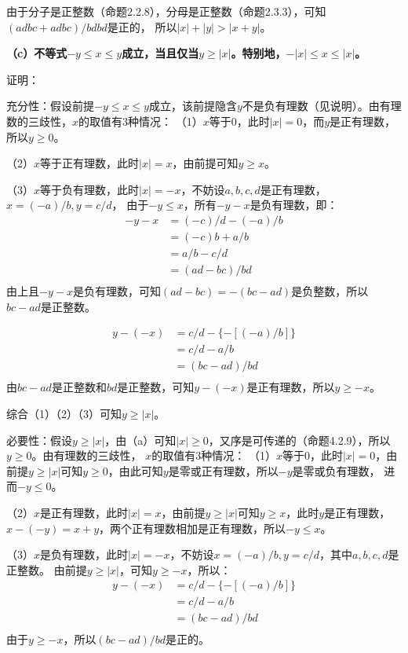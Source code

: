 \documentclass{article}
\theoremstyle{mystyle}
\begin{document}
由于分子是正整数（命题2.2.8），分母是正整数（命题2.3.3），可知$(adbc+adbc) / bdbd$是正的，
所以$ |x| + |y| > |x+y|$。

\textbf{（c）不等式$-y \leq x \leq y$成立，当且仅当$y \geq |x|$。特别地，$-|x| \leq x \leq |x|$。}

证明：

充分性：假设前提$-y \leq x \leq y$成立，该前提隐含$y$不是负有理数（见说明）。由有理数的三歧性，$x$的取值有3种情况：
（1）$x$等于0，此时$|x|=0$，而$y$是正有理数，所以$y \geq 0$。

（2）$x$等于正有理数，此时$|x|=x$，由前提可知$y \geq x$。

（3）$x$等于负有理数，此时$|x|=-x$，不妨设$a,b,c,d$是正有理数，$x=(-a)/b,y=c/d$，
由于$-y \leq x$，所有$-y-x$是负有理数，即：
\begin{align*}
  -y - x & = (-c)/d - (-a)/b \\
         & = (-c)b + a/b     \\
         & = a/b - c/d       \\
         & = (ad - bc) / bd  \\
\end{align*}
由上且$-y-x$是负有理数，可知$(ad-bc)=-(bc-ad)$是负整数，所以$bc-ad$是正整数。

\begin{align*}
  y - (-x) & = c/d - \{-[(-a)/b]\} \\
           & = c/d - a/b           \\
           & = (bc - ad) / bd      \\
\end{align*}
由$bc-ad$是正整数和$bd$是正整数，可知$y-(-x)$是正有理数，所以$y \geq -x$。

综合（1）（2）（3）可知$y \geq |x|$。

必要性：假设$y \geq |x|$，由（a）可知$|x| \geq 0$，又序是可传递的（命题4.2.9），所以$y \geq 0$。由有理数的三歧性，
$x$的取值有3种情况：
（1）$x$等于0，此时$|x|=0$，由前提$y \geq |x|$可知$y \geq 0$，由此可知$y$是零或正有理数，所以$-y$是零或负有理数，
进而$-y \leq 0$。

（2）$x$是正有理数，此时$|x|=x$，由前提$y \geq |x|$可知$y \geq x$，此时$y$是正有理数，$x-(-y)=x+y$，两个正有理数相加是正有理数，所以$-y \leq x$。

（3）$x$是负有理数，此时$|x|=-x$，不妨设$x=(-a)/b,y=c/d$，其中$a,b,c,d$是正整数。
由前提$y \geq |x|$，可知$y \geq -x$，所以：
\begin{align*}
  y - (-x) & = c/d - \{-[(-a)/b]\} \\
           & = c/d - a/b           \\
           & = (bc - ad)/bd        \\
\end{align*}
由于$y \geq -x$，所以$(bc - ad)/bd$是正的。
\end{document}
